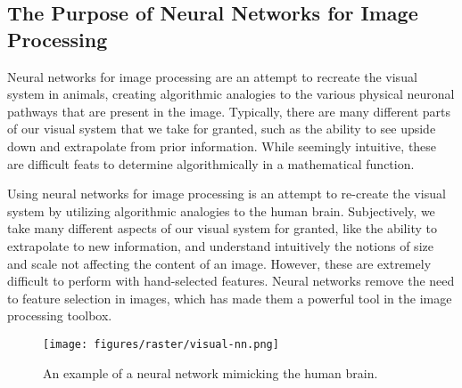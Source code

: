 \subsection{The Purpose of Neural Networks for Image Processing}

Neural networks for image processing are an attempt to recreate the visual system in animals, creating algorithmic analogies to the various physical neuronal pathways that are present in the image. Typically, there are many different parts of our visual system that we take for granted, such as the ability to see upside down and extrapolate from prior information. While seemingly intuitive, these are difficult feats to determine algorithmically in a mathematical function.

Using neural networks for image processing is an attempt to re-create the visual system by utilizing algorithmic analogies to the human brain. Subjectively, we take many different aspects of our visual system for granted, like the ability to extrapolate to new information, and understand intuitively the notions of size and scale not affecting the content of an image. However, these are extremely difficult to perform with hand-selected features. Neural networks remove the need to feature selection in images, which has made them a powerful tool in the image processing toolbox.

\begin{figure}[h!]
  \centering
  \texttt{[image: figures/raster/visual-nn.png]}
  \caption{An example of a neural network mimicking the human brain.}
  \label{fig:nn-purpose-zebra}
\end{figure}

